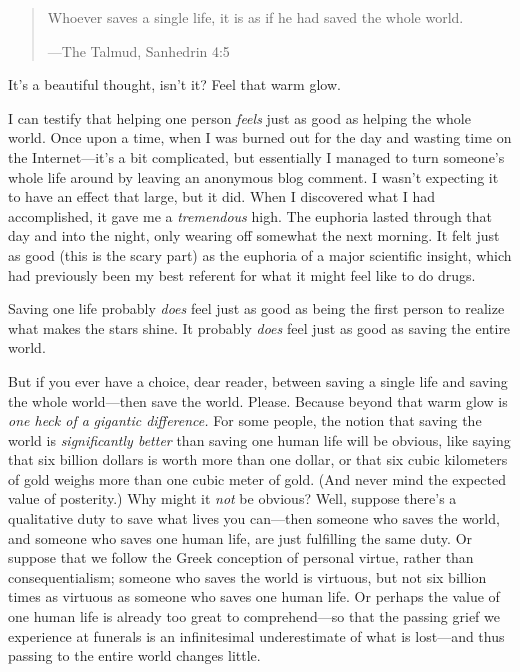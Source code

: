 \bigskip


\begin{quote}
{
 Whoever saves a single life, it is as if he had saved the whole
world.}

{\raggedleft
 {}---The Talmud, Sanhedrin 4:5
 \par}
\end{quote}


{
 It's a beautiful thought, isn't
it? Feel that warm glow.}

{
 I can testify that helping one person \textit{feels} just as good
as helping the whole world. Once upon a time, when I was burned out for
the day and wasting time on the Internet---it's a bit
complicated, but essentially I managed to turn
someone's whole life around by leaving an anonymous
blog comment. I wasn't expecting it to have an effect
that large, but it did. When I discovered what I had accomplished, it
gave me a \textit{tremendous} high. The euphoria lasted through that
day and into the night, only wearing off somewhat the next morning. It
felt just as good (this is the scary part) as the euphoria of a major
scientific insight, which had previously been my best referent for what
it might feel like to do drugs.}

{
 Saving one life probably \textit{does} feel just as good as being
the first person to realize what makes the stars shine. It probably
\textit{does} feel just as good as saving the entire world.}

{
 But if you ever have a choice, dear reader, between saving a
single life and saving the whole world---then save the world. Please.
Because beyond that warm glow is \textit{one heck of a}
\textit{gigantic difference.} For some people, the notion that saving
the world is \textit{significantly better} than saving one human life
will be obvious, like saying that six billion dollars is worth more
than one dollar, or that six cubic kilometers of gold weighs more than
one cubic meter of gold. (And never mind the expected value of
posterity.) Why might it \textit{not} be obvious? Well, suppose
there's a qualitative duty to save what lives you
can---then someone who saves the world, and someone who saves one human
life, are just fulfilling the same duty. Or suppose that we follow the
Greek conception of personal virtue, rather than consequentialism;
someone who saves the world is virtuous, but not six billion times as
virtuous as someone who saves one human life. Or perhaps the value of
one human life is already too great to comprehend---so that the passing
grief we experience at funerals is an infinitesimal underestimate of
what is lost---and thus passing to the entire world changes little.}


